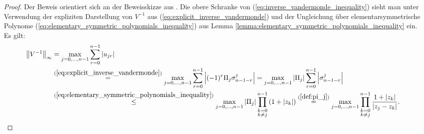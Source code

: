\begin{proof}
    Der Beweis orientiert sich an der Beweisskizze aus
    \cite[S. 196-197]{gautschi1}.
    Die obere Schranke von (\ref{eq:inverse_vandermonde_inequality}) sieht man
    unter Verwendung der expliziten Darstellung von $V^{-1}$ aus
    (\ref{eq:explicit_inverse_vandermonde}) und der Ungleichung über
    elementarsymmetrische Polynome
    (\ref{eq:elementary_symmetric_polynomials_inequality}) aus Lemma
    \ref{lemma:elementary_symmetric_polynomials_inequality} ein.
    Es gilt:
    \begin{equation*}
        \begin{split}
            \left\lVert V^{-1} \right\rVert_{\infty}
            &= \max_{j=0, \dots, n-1} \sum_{r=0}^{n-1} \left\lvert u_{jr} \right\rvert\\
            &\overset{(\ref{eq:explicit_inverse_vandermonde})}{=}
              \max_{j=0, \dots, n-1} \sum_{r=0}^{n-1} \left\lvert (-1)^{r} \Pi_j \sigma_{n-1-r}^{j} \right\rvert
            = \max_{j=0, \dots, n-1} \left\lvert \Pi_j \right\rvert \sum_{r=0}^{n-1} \left\lvert \sigma_{n-1-r}^{j} \right\rvert\\
            &\overset{(\ref{eq:elementary_symmetric_polynomials_inequality})}{\leq}
              \max_{j=0, \dots, n-1} \left\lvert \Pi_j \right\rvert \prod_{\substack{k=0\\ k \neq j}}^{n-1} \left( 1 + \left\lvert z_k \right\rvert \right)
            \overset{(\ref{def:pi_j})}{=}
              \max_{j=0, \dots, n-1} \prod_{\substack{k=0\\ k \neq j}}^{n-1} \frac{1 + \left\lvert z_k \right\rvert}{\left\lvert z_j - z_k \right\rvert}.
        \end{split}
    \end{equation*}


\end{proof}
